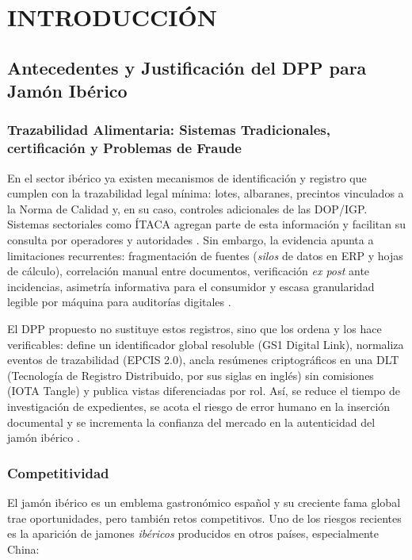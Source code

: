\chapter{INTRODUCCIÓN}\label{ch:intro}

\section{Antecedentes y Justificación del DPP para Jamón Ibérico}\label{sec:intro-antecedentes}

\subsection{Trazabilidad Alimentaria: Sistemas Tradicionales, certificación y Problemas de Fraude}\label{sec:intro-trazabilidad}
En el sector ibérico ya existen mecanismos de identificación y registro que cumplen con la trazabilidad legal mínima: lotes, albaranes, precintos vinculados a la Norma de Calidad y, en su caso, controles adicionales de las DOP/IGP. Sistemas sectoriales como ÍTACA agregan parte de esta información y facilitan su consulta por operadores y autoridades \cite{}. Sin embargo, la evidencia apunta a limitaciones recurrentes: fragmentación de fuentes (\textit{silos} de datos en ERP y hojas de cálculo), correlación manual entre documentos, verificación \textit{ex post} ante incidencias, asimetría informativa para el consumidor y escasa granularidad legible por máquina para auditorías digitales \cite{}.

El DPP propuesto no sustituye estos registros, sino que los ordena y los hace verificables: define un identificador global resoluble (GS1 Digital Link), normaliza eventos de trazabilidad (EPCIS 2.0), ancla resúmenes criptográficos en una DLT (Tecnología de Registro Distribuido, por sus siglas en inglés) sin comisiones (IOTA Tangle) y publica vistas diferenciadas por rol. Así, se reduce el tiempo de investigación de expedientes, se acota el riesgo de error humano en la inserción documental y se incrementa la confianza del mercado en la autenticidad del jamón ibérico \cite{}.

\subsection{Competitividad}\label{sec:intro-competitividad}
El jamón ibérico es un emblema gastronómico español y su creciente fama global trae oportunidades, pero también retos competitivos. Uno de los riesgos recientes es la aparición de jamones \textit{ibéricos} producidos en otros países, especialmente China:

